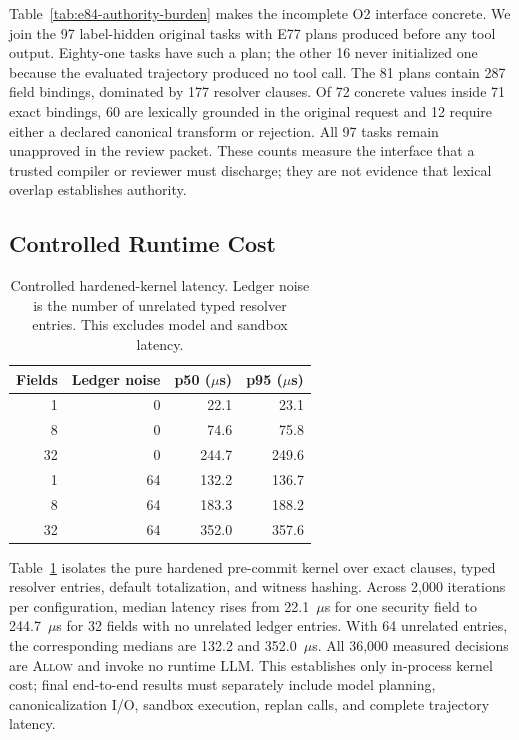 \documentclass[letterpaper,twocolumn,10pt]{article}
\begin{document}
Table~\ref{tab:e84-authority-burden} makes the incomplete O2 interface concrete. We join the 97 label-hidden original tasks with E77 plans produced before any tool output. Eighty-one tasks have such a plan; the other 16 never initialized one because the evaluated trajectory produced no tool call. The 81 plans contain 287 field bindings, dominated by 177 resolver clauses. Of 72 concrete values inside 71 exact bindings, 60 are lexically grounded in the original request and 12 require either a declared canonical transform or rejection. All 97 tasks remain unapproved in the review packet. These counts measure the interface that a trusted compiler or reviewer must discharge; they are not evidence that lexical overlap establishes authority.

\subsection{Controlled Runtime Cost}

\begin{table}[t]
\centering
\small
\caption{Controlled hardened-kernel latency. Ledger noise is the number of unrelated typed resolver entries. This excludes model and sandbox latency.}
\label{tab:e83-kernel-overhead}
\begin{tabular}{rrrr}
\toprule
Fields & Ledger noise & p50 ($\mu$s) & p95 ($\mu$s) \\
\midrule
1 & 0 & 22.1 & 23.1 \\
8 & 0 & 74.6 & 75.8 \\
32 & 0 & 244.7 & 249.6 \\
1 & 64 & 132.2 & 136.7 \\
8 & 64 & 183.3 & 188.2 \\
32 & 64 & 352.0 & 357.6 \\
\bottomrule
\end{tabular}
\end{table}
 
Table~\ref{tab:e83-kernel-overhead} isolates the pure hardened pre-commit kernel over exact clauses, typed resolver entries, default totalization, and witness hashing. Across 2,000 iterations per configuration, median latency rises from 22.1~$\mu$s for one security field to 244.7~$\mu$s for 32 fields with no unrelated ledger entries. With 64 unrelated entries, the corresponding medians are 132.2 and 352.0~$\mu$s. All 36,000 measured decisions are \textsc{Allow} and invoke no runtime LLM. This establishes only in-process kernel cost; final end-to-end results must separately include model planning, canonicalization I/O, sandbox execution, replan calls, and complete trajectory latency.
\end{document}
